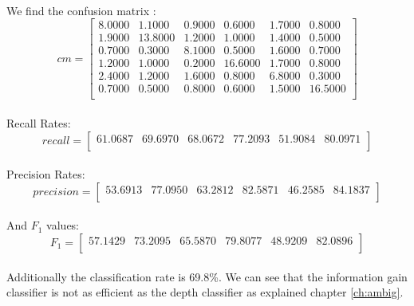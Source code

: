 \documentclass[a4paper,12pt,oneside,final]{report}
\begin{document}
\paragraph{}
We find the confusion matrix :
\[
cm = \left[\begin{array}{cccccc}
    8.0000  &  1.1000  &  0.9000  &  0.6000  &  1.7000  &  0.8000 \\
    1.9000  & 13.8000  &  1.2000  &  1.0000  &  1.4000  &  0.5000 \\
    0.7000  &  0.3000  &  8.1000  &  0.5000  &  1.6000  &  0.7000 \\
    1.2000  &  1.0000  &  0.2000  & 16.6000  &  1.7000  &  0.8000 \\
    2.4000  &  1.2000  &  1.6000  &  0.8000  &  6.8000  &  0.3000 \\
    0.7000  &  0.5000  &  0.8000  &  0.6000  &  1.5000  & 16.5000 \\

\end{array}
\right]
\]
\paragraph{}
Recall Rates:
\[
recall = \left[\begin{array}{cccccc}
61.0687 &  69.6970  & 68.0672 &  77.2093 &  51.9084  & 80.0971 \\
\end{array}
\right]
\]
\paragraph{}
Precision Rates:
\[
precision = \left[\begin{array}{cccccc}
 53.6913  & 77.0950 &  63.2812 &  82.5871  & 46.2585  & 84.1837 \\
\end{array}
\right]
\]
\paragraph{}
And $F_{1}$ values: 
\[
F_{1} = \left[\begin{array}{cccccc}
57.1429  & 73.2095 &  65.5870  & 79.8077  & 48.9209  & 82.0896 \\
\end{array}
\right]
\]
\paragraph{}
Additionally the classification rate is 69.8\%. We can see that the information gain classifier is not as efficient as the depth classifier as explained chapter \ref{ch:ambig}.
\end{document}
